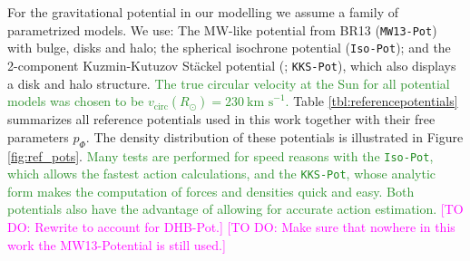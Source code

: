 \documentclass[iop,revtex4]{emulateapj}
\newcommand{\NEW}[1]{\textcolor{ForestGreen}{#1}}
\newcommand{\Wilma}[1]{\textcolor{Magenta}{#1}}
\begin{document}
For the gravitational potential in our modelling we assume a family of parametrized models. We use: The MW-like potential from BR13 (\texttt{MW13-Pot}) with bulge, disks and halo; the spherical isochrone potential (\texttt{Iso-Pot}); and the 2-component Kuzmin-Kutuzov St\"{a}ckel potential (\citealt{1994AA...287...43B}; \texttt{KKS-Pot}), which also displays a disk and halo structure. \NEW{The true circular velocity at the Sun for all potential models was chosen to be $v_\text{circ}(R_\odot)=230~\text{km s}^{-1}$.} Table \ref{tbl:referencepotentials} summarizes all reference potentials used in this work together with their free parameters $p_\Phi$. The density distribution of these potentials is illustrated in Figure \ref{fig:ref_pots}. \NEW{Many tests are performed for speed reasons with the \texttt{Iso-Pot}, which allows the fastest action calculations, and the \texttt{KKS-Pot}, whose analytic form makes the computation of forces and densities quick and easy. Both potentials also have the advantage of allowing for accurate action estimation.}
\Wilma{[TO DO: Rewrite to account for DHB-Pot.]}
\Wilma{[TO DO: Make sure that nowhere in this work the MW13-Potential is still used.]}
\end{document}
